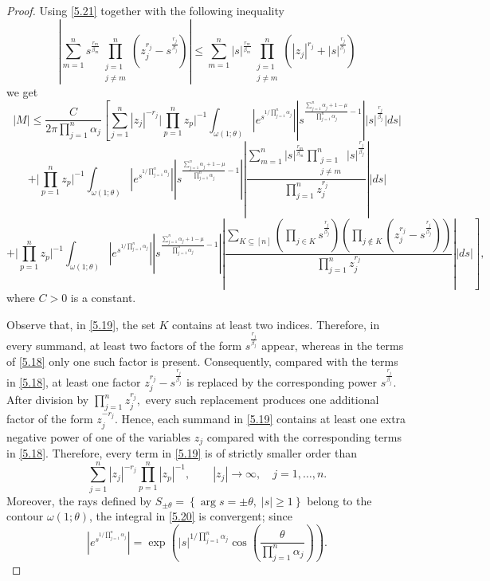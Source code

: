 \documentclass[12pt, reqno]{amsart}
\theoremstyle{definition}
\theoremstyle{remark}
\numberwithin{equation}{section}
\begin{document}
\begin{proof}
Using \eqref{5.21} together with the following inequality
$$\left|\sum\limits_{m=1}^ns^{\frac{r_m}{\beta_m}}
\prod\limits_{\substack{j=1\\j\neq m}}^n
\left(
z_j^{r_j}-s^{\frac{r_j}{\beta_j}}
\right)
\right|
\le
\sum\limits_{m=1}^n\left|s\right|^{\frac{r_m}{\beta_m}}\prod\limits_{\substack{j=1\\j\neq m}}^n
\left(
|z_j|^{r_j}
+
|s|^{\frac{r_j}{\beta_j}}
\right)$$
we get 
$$|M|\le
\frac{C}{2\pi \prod\limits_{{j=1}}^n\alpha_j}\left[\sum_{j=1}^n|z_j|^{-r_j}\Bigg|\prod_{p=1}^nz_p\Bigg|^{-1}\int_{\omega(1;\theta)}
\left|e^{s^{1/\prod\limits_{{j=1}}^n\alpha_j}}
\right|\left|s^{\frac{\sum\limits_{j=1}^n\alpha_j+1-\mu}{\prod\limits_{j=1}^n\alpha_j}-1}\right|\left|s\right|^{\frac{r_j}{\beta_j}}\left|ds\right|\right.$$
$$
+\Bigg|\prod_{p=1}^nz_p\Bigg|^{-1}\int_{\omega(1;\theta)}
\left|e^{s^{1/\prod\limits_{{j=1}}^n\alpha_j}}
\right|\left|s^{\frac{\sum\limits_{j=1}^n\alpha_j+1-\mu}{\prod\limits_{j=1}^n\alpha_j}-1}\right|\left|\frac{\sum\limits_{m=1}^n\left|s\right|^{\frac{r_m}{\beta_m}}\prod\limits_{\substack{j=1\\j\neq m}}^n\left|s\right|^{\frac{r_j}{\beta_j}}}{\prod\limits_{j=1}^nz_j^{r_j}}\right|\left|ds\right|
$$
$$+\left.\Bigg|\prod_{p=1}^nz_p\Bigg|^{-1}\int_{\omega(1;\theta)}\left|e^{s^{1/\prod\limits_{{j=1}}^n\alpha_j}}
\right|\left|s^{\frac{\sum\limits_{j=1}^n\alpha_j+1-\mu}{\prod\limits_{j=1}^n\alpha_j}-1}\right|\left|\frac{\sum \limits_{K\subseteq[n]}
\left(
\prod\limits_{j\in K}s^{\frac{r_j}{\beta_j}}
\right)
\left(
\prod\limits_{j\notin K}\left(z_j^{r_j}-s^{\frac{r_j}{\beta_j}}\right)
\right)}{\prod\limits_{j=1}^nz_j^{r_j}}\right||ds|\right],
$$
where $C>0$ is a constant.


Observe that, in \eqref{5.19}, the set $K$ contains at least two indices. Therefore, in every summand, at least two factors of the form
$
s^{\frac{r_j}{\beta_j}}
$
appear, whereas in the terms of \eqref{5.18} only one such factor is present. Consequently, compared with the terms in \eqref{5.18}, at least one factor
$
z_j^{r_j}-s^{\frac{r_j}{\beta_j}}
$
is replaced by the corresponding power
$
s^{\frac{r_j}{\beta_j}}.
$
After division by
$
\prod\limits_{j=1}^{n}z_j^{r_j},
$
every such replacement produces one additional factor of the form
$
z_j^{-r_j}.
$
Hence, each summand in \eqref{5.19} contains at least one extra negative power of one of the variables $z_j$ compared with the corresponding terms in \eqref{5.18}. Therefore, every term in \eqref{5.19} is of strictly smaller order than
\[
\sum_{j=1}^n|z_j|^{-r_j}
\prod_{p=1}^{n}|z_p|^{-1},
\qquad
|z_j|\to\infty,\quad j=1,\ldots,n.
\]
Moreover, the rays defined by
$
S_{\pm\theta}
=
\left\{
\arg s = \pm \theta,\; |s| \ge 1
\right\}
$
belong to the contour $\omega(1;\theta)$, the integral in \eqref{5.20} is convergent; since
\[
\left|e^{s^{1/\prod\limits_{{j=1}}^n\alpha_j}}\right|
=
\exp\!\left(
|s|^{{1/\prod\limits_{{j=1}}^n\alpha_j}}
\cos\!\left(\frac{\theta}{\prod\limits_{{j=1}}^n\alpha_j}\right)
\right).
\]


\end{proof}
\end{document}
